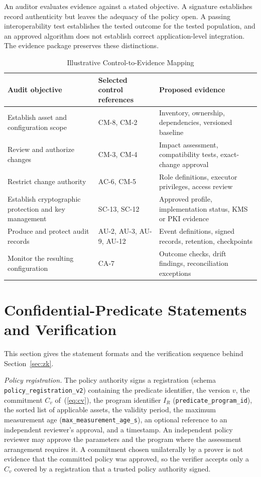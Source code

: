 \documentclass[journal]{IEEEtran}
\newcommand{\code}[1]{\texttt{\footnotesize #1}}
\begin{document}
An auditor evaluates evidence against a stated objective. A signature establishes record authenticity but leaves the adequacy of the policy open. A passing interoperability test establishes the tested outcome for the tested population, and an approved algorithm does not establish correct application-level integration. The evidence package preserves these distinctions.

\begin{table}[!t]
\caption{Illustrative Control-to-Evidence Mapping}
\label{tab:controls}
\centering
\begin{tabular}{>{\raggedright\arraybackslash}p{4.4cm}>{\raggedright\arraybackslash}p{3.6cm}>{\raggedright\arraybackslash}p{7.4cm}}
\toprule
Audit objective & Selected control references & Proposed evidence \\
\midrule
Establish asset and configuration scope & CM-8, CM-2 & Inventory, ownership, dependencies, versioned baseline \\
Review and authorize changes & CM-3, CM-4 & Impact assessment, compatibility tests, exact-change approval \\
Restrict change authority & AC-6, CM-5 & Role definitions, executor privileges, access review \\
Establish cryptographic protection and key management & SC-13, SC-12 & Approved profile, implementation status, KMS or PKI evidence \\
Produce and protect audit records & AU-2, AU-3, AU-9, AU-12 & Event definitions, signed records, retention, checkpoints \\
Monitor the resulting configuration & CA-7 & Outcome checks, drift findings, reconciliation exceptions \\
\bottomrule
\end{tabular}
\end{table}

\section{Confidential-Predicate Statements and Verification}
\label{s:zkstatement}
This section gives the statement formats and the verification sequence behind Section~\ref{sec:zk}.

\emph{Policy registration.} The policy authority signs a registration (schema \code{policy\_registration\_v2}) containing the predicate identifier, the version $v$, the commitment $C_v$ of~(\ref{eq:cv}), the program identifier $I_R$ (\code{predicate\_program\_id}), the sorted list of applicable assets, the validity period, the maximum measurement age (\code{max\_measurement\_age\_s}), an optional reference to an independent reviewer's approval, and a timestamp. An independent policy reviewer may approve the parameters and the program where the assessment arrangement requires it. A commitment chosen unilaterally by a prover is not evidence that the committed policy was approved, so the verifier accepts only a $C_v$ covered by a registration that a trusted policy authority signed.
\end{document}
